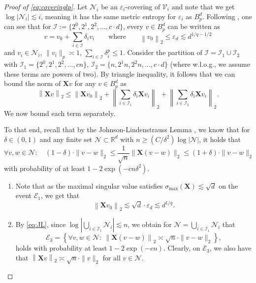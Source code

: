 \documentclass[a4paper]{article}
\newcommand{\mathset}[1]{\left\{#1\right\}}
\newcommand{\pr}[1]{\left(#1\right)}
\newcommand{\abs}[1]{\left\lvert#1\right\rvert}
\newcommand{\norm}[1]{\left\|#1\right\|}
\newcommand{\X}[0]{\mathbf{X}}
\newcommand{\RR}[0]{\mathbb{R}}
\newcommand{\cE}[0]{\mathcal{E}}
\newcommand{\cI}[0]{\mathcal{I}}
\newcommand{\cN}[0]{\mathcal{N}}
\newcommand{\cV}[0]{\mathcal{V}}
\newcommand{\eps}[0]{\varepsilon}
\theoremstyle{thmstyle}
\theoremstyle{defstyle}
\theoremstyle{remark}
\begin{document}
\begin{proof}[Proof of \eqref{eq:coveringlp}]
    Let $\cN_i$ be an $\eps_i$-covering of $\cV_i$ and note that \citep[underneath Equation (25)]{Kur2024minimum} we get $\log \abs{\cN_i} \lesssim i$, meaning it has the same metric entropy for $\eps_i$ as $B_p^d$.
    Following \cite{Schutt1984entropy,Kur2024minimum}, one can see that for $\cI := \{2^0,2^1,2^2,\ldots,c \cdot d \}$, every  $v \in B_{p}^d$ can be written as
    \begin{equation*}  
        v = v_0 + \sum_{i\in \cI}\delta_i v_i  \qquad \text{where} \qquad \norm{v_0}_2 \leq \eps_{d} \lesssim d^{1/q - 1/2} 
    \end{equation*}
    and $v_i\in \cN_i$, $\|v_i\|_p\asymp 1 $, $\sum_{i\in \cI}\delta_i^{p} \leq 1$. Consider the partition of $\cI=\cI_1\cup \cI_2$ with $\cI_1 = \{2^0,2^1,2^2,\ldots,c n \}$, $\cI_2 =  \{n,2^1n,2^2n,\ldots,c \cdot d\}$ (where w.l.o.g., we assume these terms are powers of two).
    By triangle inequality, it follows that we can bound the norm of $\X v$ for any $v\in B_p^d$ as 
    \begin{equation*}
        \norm{\X v}_2 \leq \norm{\X v_0}_2 + \norm{\sum_{i\in \cI_1} \delta_i \X v_i}_2 + \norm{\sum_{i\in \cI_2} \delta_i \X v_i}_2.
    \end{equation*}
    We now bound each term separately.

    To that end, recall that by the Johnson-Lindenstrauss Lemma \citep[Theorem 5.3.1 and Exercise 5.3.3]{Vershynin2018}, we know that for $\delta \in (0,1)$ and any finite set $\cN\subset \RR^d$ with $n\geq (C/\delta^2)\log \abs{\cN}$, it holds that
    \begin{equation}\label{eq:JL}
       \forall v,w\in \cN: \quad (1 - \delta) \cdot \|v-w\|_{2} \leq  \frac{1}{\sqrt{n}}\|\mathbf{X}(v-w)\|_{2} \leq (1+ \delta) \cdot \|v-w\|_{2}
    \end{equation}
    with probability of at least $1-2\exp(-cn\delta^2)$.

    \begin{enumerate}
        \item Note that as the maximal singular value satisfies $\sigma_{\max}(\mathbf X) \lesssim \sqrt{d}$ on the event $\cE_1$, we get that
        \begin{equation*}
            \norm{\mathbf{X} v_0}_2 \lesssim \sqrt{d} \cdot \varepsilon_{d} \lesssim  d^{1/q}.
        \end{equation*}
    
        \item By \eqref{eq:JL}, since $\log \abs{\bigcup_{i \in \cI_1}\cN_i} \lesssim n $, we obtain for $ \cN = \bigcup_{i\in \cI_1}\cN_i$ that
        \begin{equation*}
            \cE_3 = \mathset{\forall v,w\in \cN:\  \norm{\X (v-w)}_{2} \asymp \sqrt{n} \cdot \|v-w\|_{2}},
        \end{equation*}
        holds with probability at least $1-2\exp\pr{-cn}$. Clearly, on $\cE_3$, we also have that $\norm{\X v}_{2} \asymp \sqrt{n} \cdot \|v\|_{2}$ for all $v\in \cN$.
    

\end{enumerate}
\end{proof}
\end{document}
